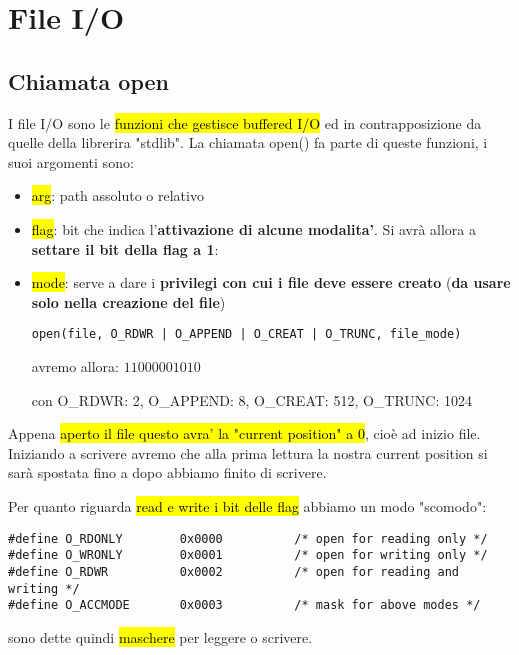 \newpage
\section{File I/O}


\subsection{Chiamata open}

I file I/O sono le \hl{funzioni che gestisce buffered I/O} ed in contrapposizione da quelle della librerira "stdlib". La chiamata open() fa parte di queste funzioni, i suoi argomenti sono:

\begin{itemize}
	\item \hl{arg}: path assoluto o relativo
	\item \hl{flag}: bit che indica l'\textbf{attivazione di alcune modalita'}. Si avrà allora a \textbf{settare il bit della flag a 1}:
	\item \hl{mode}: serve a dare i \textbf{privilegi con cui i file deve essere creato} (\textbf{da usare solo nella creazione del file})
\begin{lstlisting}
open(file, O_RDWR | O_APPEND | O_CREAT | O_TRUNC, file_mode)
\end{lstlisting}

		avremo allora: $11000001010$

		con O\_RDWR: 2, O\_APPEND: 8, O\_CREAT: 512, O\_TRUNC: 1024
		
		
\end{itemize}

Appena \hl{aperto il file questo avra' la "current position" a 0}, cioè ad inizio file. Iniziando a scrivere avremo che alla prima lettura la nostra current position si sarà spostata fino a dopo abbiamo finito di scrivere.

Per quanto riguarda \hl{read e write i bit delle flag} abbiamo un modo "scomodo":

\begin{lstlisting}
#define O_RDONLY        0x0000          /* open for reading only */
#define O_WRONLY        0x0001          /* open for writing only */
#define O_RDWR          0x0002          /* open for reading and writing */
#define O_ACCMODE       0x0003          /* mask for above modes */
\end{lstlisting}

sono dette quindi \hl{maschere} per leggere o scrivere.

